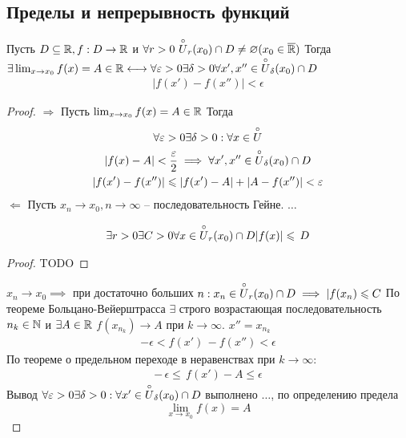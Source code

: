 \subsection{Пределы и непрерывность функций}
\begin{theorem}
	Пусть $ D \subseteq \mathbb{R}, f:D\to \mathbb{R} $ и $ \forall r > 0\ \overset{\circ}{U}_r(x_0) \cap D \neq  \varnothing(x_0 \in \overline{ \mathbb{R}}) $
	Тогда $ \exists \lim_{x\to x_0}f(x) = A \in \mathbb{R} \longleftrightarrow \forall  \varepsilon > 0 \exists \delta > 0 \forall x', x'' \in \overset{\circ}{U}_\delta(x_0)\cap D $
	 \begin{gather}
		|f(x') - f(x'')| < \epsilon
	\end{gather}
\end{theorem}
\begin{proof}
	 $ \Longrightarrow $
	Пусть $ \lim_{x \to  x_0}f(x) = A \in  \mathbb{R} $ Тогда \begin{gather}
		\forall \varepsilon > 0 \exists \delta > 0: \forall x \in \overset{\circ}{U} \\
		|f(x) - A| < \dfrac{\varepsilon}{2} \implies \forall x', x'' \in \overset{\circ}{U}_\delta (x_0)\cap D \\
		|f(x') - f(x'')| \leqslant |f(x') - A| + |A - f(x'')| < \varepsilon
	\end{gather}
	 $ \Longleftarrow $ Пусть $ x_n \to x_0, n \to \infty $ -- последовательность Гейне.
	 $ \dots  $ \begin{lemma}
	 \begin{gather}
		\exists r > 0 \exists C > 0 \forall x \in \overset{\circ}{U}_r(x_0)\cap D |f(x)| \leqslant\, D
	\end{gather}
\end{lemma}
	\begin{proof}
		TODO
	\end{proof}
	 $ x_n \to  x_0 \implies$ при достаточно больших $ n: x_n \in \overset{\circ}{U}_r(x_0) \cap D \implies  |f(x_n) \leqslant  C$
	 По теореме Больцано-Вейерштрасса $ \exists  $ строго возрастающая последовательность $ n_k \in \mathbb{N} $ и $ \exists  A \in \mathbb{R} $ $ f(x_{n_k}) \to A $ при $ k \to \infty $.
	 $ x'' = x_{n_k} $
	 \begin{gather}
		 - \epsilon < f(x')\, - f(x'') < \epsilon
	\end{gather}
	По теореме о предельном переходе в неравенствах при $ k \to  \infty $: \begin{gather}
		 -\, \epsilon \leq\, f(x') - A \leq \epsilon
	\end{gather}
	Вывод $ \forall \varepsilon > 0 \exists \delta > 0: \forall x' \in \overset{\circ}{U}_\delta(x_0) \cap D $ выполнено $ \dots  $, по определению предела \[ \lim_{x \to  x_0}f(x) = A \] 
\end{proof}
